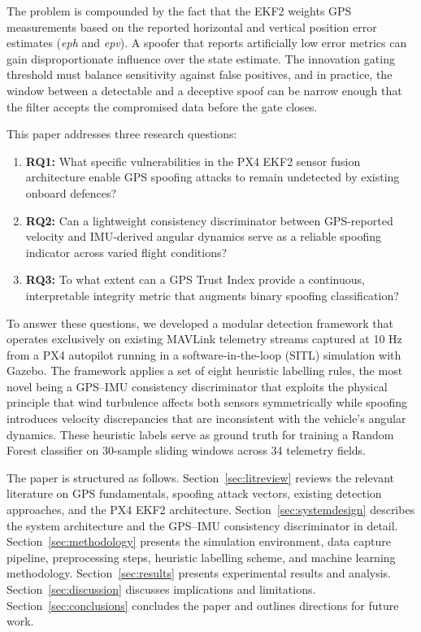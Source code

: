 \documentclass[electronics,article,accept,moreauthors]{Definitions/mdpi}
\begin{document}
The problem is compounded by the fact that the EKF2 weights GPS measurements based on the reported horizontal and vertical position error estimates ({\it eph} and {\it epv}). A spoofer that reports artificially low error metrics can gain disproportionate influence over the state estimate. The innovation gating threshold must balance sensitivity against false positives, and in practice, the window between a detectable and a deceptive spoof can be narrow enough that the filter accepts the compromised data before the gate closes.

This paper addresses three research questions:

\begin{enumerate}
\item \textbf{RQ1:} What specific vulnerabilities in the PX4 EKF2 sensor fusion architecture enable GPS spoofing attacks to remain undetected by existing onboard defences?
\item \textbf{RQ2:} Can a lightweight consistency discriminator between GPS-reported velocity and IMU-derived angular dynamics serve as a reliable spoofing indicator across varied flight conditions?
\item \textbf{RQ3:} To what extent can a GPS Trust Index provide a continuous, interpretable integrity metric that augments binary spoofing classification?
\end{enumerate}

To answer these questions, we developed a modular detection framework that operates exclusively on existing MAVLink telemetry streams captured at 10 Hz from a PX4 autopilot running in a software-in-the-loop (SITL) simulation with Gazebo. The framework applies a set of eight heuristic labelling rules, the most novel being a GPS--IMU consistency discriminator that exploits the physical principle that wind turbulence affects both sensors symmetrically while spoofing introduces velocity discrepancies that are inconsistent with the vehicle's angular dynamics. These heuristic labels serve as ground truth for training a Random Forest classifier on 30-sample sliding windows across 34 telemetry fields.

The paper is structured as follows. Section~\ref{sec:litreview} reviews the relevant literature on GPS fundamentals, spoofing attack vectors, existing detection approaches, and the PX4 EKF2 architecture. Section~\ref{sec:systemdesign} describes the system architecture and the GPS--IMU consistency discriminator in detail. Section~\ref{sec:methodology} presents the simulation environment, data capture pipeline, preprocessing steps, heuristic labelling scheme, and machine learning methodology. Section~\ref{sec:results} presents experimental results and analysis. Section~\ref{sec:discussion} discusses implications and limitations. Section~\ref{sec:conclusions} concludes the paper and outlines directions for future work.
\end{document}
